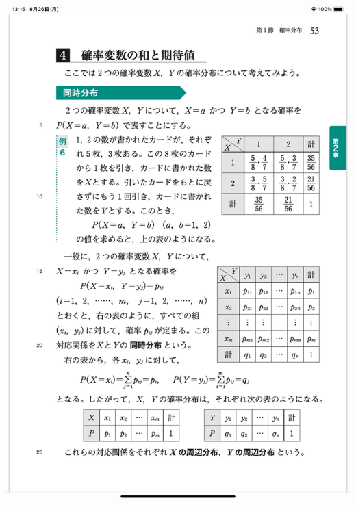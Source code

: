 \documentclass[landscape,a3paper]{ltjsarticle}
\begin{document}
\begin{multicols*}{4}

  \begin{minipage}{0.9\columnwidth}
   \includegraphics[trim=40 100 110 100, width=1\textwidth, clip]{text/ksB_053.PNG}
  \end{minipage}
 
\end{multicols*}
\end{document}
